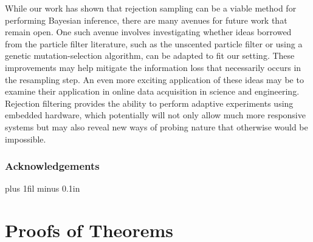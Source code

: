 \documentclass[twoside]{article}
\begin{document}
While our work has shown that rejection sampling can be a viable method for performing Bayesian inference, there are many
avenues for future work that remain open.  One such avenue involves investigating whether ideas borrowed from the particle
filter literature, such as the unscented particle filter or using a genetic mutation-selection algorithm, can be adapted to fit our setting.
  These improvements may help mitigate the information loss that necessarily occurs in the resampling step.  An even more exciting
application of these ideas may be to examine their application in online data acquisition in science and engineering.  Rejection
filtering provides the ability to perform adaptive experiments using embedded hardware, which potentially will not only allow
much more responsive systems but may also reveal new ways of probing nature that otherwise would be impossible.
\label{sec:conclusions}





\appendix

\subsubsection*{Acknowledgements}





\clearpage
\onecolumn

\thispagestyle{empty}
  \hsize\textwidth
  \linewidth\hsize {}
 \bottomtitlebar \vskip 0.2in plus 1fil minus 0.1in

\section{Proofs of Theorems}
\end{document}
